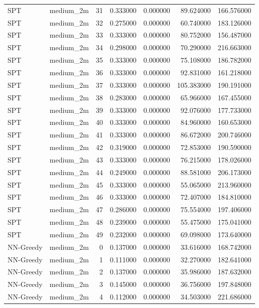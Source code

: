 \begin{tabular}{llrrrrr}
SPT & medium_2m & 31 & 0.333000 & 0.000000 & 89.624000 & 166.576000 \\
SPT & medium_2m & 32 & 0.275000 & 0.000000 & 60.740000 & 183.126000 \\
SPT & medium_2m & 33 & 0.333000 & 0.000000 & 80.752000 & 156.487000 \\
SPT & medium_2m & 34 & 0.298000 & 0.000000 & 70.290000 & 216.663000 \\
SPT & medium_2m & 35 & 0.333000 & 0.000000 & 75.108000 & 186.782000 \\
SPT & medium_2m & 36 & 0.333000 & 0.000000 & 92.831000 & 161.218000 \\
SPT & medium_2m & 37 & 0.333000 & 0.000000 & 105.383000 & 190.191000 \\
SPT & medium_2m & 38 & 0.283000 & 0.000000 & 65.966000 & 167.455000 \\
SPT & medium_2m & 39 & 0.333000 & 0.000000 & 92.076000 & 177.733000 \\
SPT & medium_2m & 40 & 0.333000 & 0.000000 & 84.960000 & 160.653000 \\
SPT & medium_2m & 41 & 0.333000 & 0.000000 & 86.672000 & 200.746000 \\
SPT & medium_2m & 42 & 0.319000 & 0.000000 & 72.853000 & 190.590000 \\
SPT & medium_2m & 43 & 0.333000 & 0.000000 & 76.215000 & 178.026000 \\
SPT & medium_2m & 44 & 0.249000 & 0.000000 & 88.581000 & 206.173000 \\
SPT & medium_2m & 45 & 0.333000 & 0.000000 & 55.065000 & 213.960000 \\
SPT & medium_2m & 46 & 0.333000 & 0.000000 & 72.407000 & 184.810000 \\
SPT & medium_2m & 47 & 0.286000 & 0.000000 & 75.554000 & 197.406000 \\
SPT & medium_2m & 48 & 0.239000 & 0.000000 & 55.475000 & 175.041000 \\
SPT & medium_2m & 49 & 0.232000 & 0.000000 & 69.098000 & 173.640000 \\
NN-Greedy & medium_2m & 0 & 0.137000 & 0.000000 & 33.616000 & 168.742000 \\
NN-Greedy & medium_2m & 1 & 0.111000 & 0.000000 & 32.270000 & 182.641000 \\
NN-Greedy & medium_2m & 2 & 0.137000 & 0.000000 & 35.986000 & 187.632000 \\
NN-Greedy & medium_2m & 3 & 0.145000 & 0.000000 & 36.756000 & 197.848000 \\
NN-Greedy & medium_2m & 4 & 0.112000 & 0.000000 & 34.503000 & 221.686000 \\

\end{tabular}
